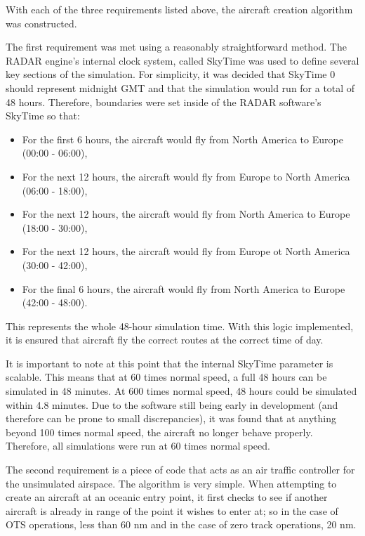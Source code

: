 \documentclass[stu, a4paper, 12pt, floatsintext]{apa7}
\numberwithin{figure}{section}
\numberwithin{table}{section}
\numberwithin{equation}{section}
\begin{document}
With each of the three requirements listed above, the aircraft creation algorithm was constructed.

The first requirement was met using a reasonably straightforward method. The RADAR engine’s internal clock system, called SkyTime was used to define several key sections of the simulation. For simplicity, it was decided that SkyTime 0 should represent midnight GMT and that the simulation would run for a total of 48 hours. Therefore, boundaries were set inside of the RADAR software’s SkyTime so that:

\begin{itemize}
    \item For the first 6 hours, the aircraft would fly from North America to Europe (00:00 - 06:00),
    \item For the next 12 hours, the aircraft would fly from Europe to North America (06:00 - 18:00),
    \item For the next 12 hours, the aircraft would fly from North America to Europe (18:00 - 30:00), 
    \item For the next 12 hours, the aircraft would fly from Europe ot North America (30:00 - 42:00),
    \item For the final 6 hours, the aircraft would fly from North America to Europe (42:00 - 48:00).
\end{itemize}

This represents the whole 48-hour simulation time. With this logic implemented, it is ensured that aircraft fly the correct routes at the correct time of day. 

It is important to note at this point that the internal SkyTime parameter is scalable. This means that at 60 times normal speed, a full 48 hours can be simulated in 48 minutes. At 600 times normal speed, 48 hours could be simulated within 4.8 minutes. Due to the software still being early in development (and therefore can be prone to small discrepancies), it was found that at anything beyond 100 times normal speed, the aircraft no longer behave properly. Therefore, all simulations were run at 60 times normal speed.

The second requirement is a piece of code that acts as an air traffic controller for the unsimulated airspace. The algorithm is very simple. When attempting to create an aircraft at an oceanic entry point, it first checks to see if another aircraft is already in range of the point it wishes to enter at; so in the case of OTS operations, less than 60 nm and in the case of zero track operations, 20 nm. 
\end{document}
